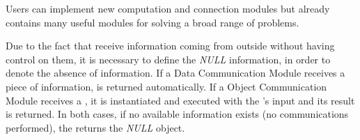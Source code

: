 Users can implement new computation and connection modules but \posl{} already contains many useful modules for solving a broad range of problems.

Due to the fact that \opchs{} receive information coming from outside without having control on them, it is necessary to define the {\it NULL} information, in order to denote the absence of information. If a Data Communication Module receives a piece of information, is returned automatically. If a Object Communication Module receives a \om{}, it is instantiated and executed with the \opch's input and its result is returned. In both cases, if no available information exists (no communications performed), the \opch{} returns the {\it NULL} object.